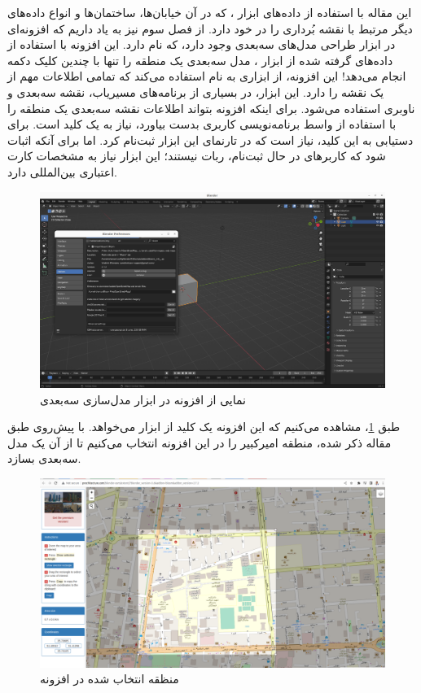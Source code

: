 این مقاله با استفاده از داده‌های ابزار ، که در آن خیابان‌ها، ساختمان‌ها و انواع داده‌های دیگر مرتبط با نقشه بُرداری را در خود دارد. از فصل سوم نیز به یاد داریم که افزونه‌ای در ابزار طراحی مدل‌های سه‌بعدی  وجود دارد، که  نام دارد. این افزونه با استفاده از داده‌های  گرفته شده از ابزار ، مدل سه‌بعدی یک منطقه را تنها با چندین کلیک دکمه انجام می‌دهد! این افزونه، از ابزاری به نام  استفاده می‌کند که تمامی اطلاعات مهم از یک نقشه را دارد. این ابزار، در بسیاری از برنامه‌های مسیریاب، نقشه سه‌بعدی و ناوبری استفاده می‌شود. برای اینکه افزونه  بتواند اطلاعات نقشه سه‌بعدی یک منطقه را با استفاده از واسط برنامه‌نویسی کاربری  بدست بیاورد، نیاز به یک کلید  است. برای دستیابی به این کلید، نیاز است که در تارنمای این ابزار ثبت‌نام کرد. اما برای آنکه اثبات شود که کاربرهای در حال ثبت‌نام، ربات نیستند؛ این ابزار نیاز به مشخصات کارت اعتباری بین‌المللی دارد.
\begin{figure}[h!]
    \centering
    \includegraphics[width=0.9\linewidth]{figures/Blender_Blosm.png}
    \caption{نمایی از افزونه  در ابزار مدل‌سازی سه‌بعدی }
    \label{fig:Blender_Blosm}
\end{figure}
طبق \cref{fig:Blender_Blosm}، مشاهده می‌کنیم که این افزونه یک کلید  از ابزار  می‌خواهد. با پیش‌روی طبق مقاله ذکر شده، منطقه امیرکبیر را در این افزونه انتخاب می‌کنیم تا از آن یک مدل سه‌بعدی بسازد. 
\begin{figure}[h!]
    \centering
    \includegraphics[width=1\linewidth]{figures/Blosm_OSM.png}
    \caption{منظقه انتخاب شده در افزونه }
    \label{fig:Blosm_OSM}
\end{figure}

